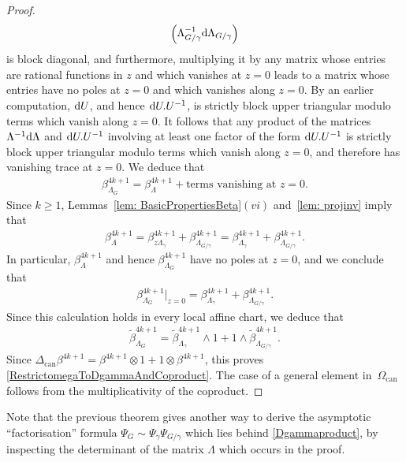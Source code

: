 \documentclass[pdftex]{sigma}%
\numberwithin{equation}{section}
\newcommand{\can}{\mathrm{can}}
\newcommand{\0}{\color{blue}{\mathsf{0}}}
\begin{document}
\begin{proof}
\begin{gather*}
\begin{pmatrix}
 \Lambda_{G/\gamma}^{-1} {\rm d} \Lambda_{G/\gamma}
 \end{pmatrix}
 \end{gather*}
is block diagonal, and furthermore, multiplying it by any matrix whose entries are rational functions in $z$ and which vanishes at $z=0$ leads to a matrix whose entries have no poles at $z=0$ and which vanishes along $z=0$. By an earlier computation, ${\rm d}U$, and hence ${\rm d}U. U^{-1}$, is strictly block upper triangular modulo terms which vanish along $z=0$.
 It follows that any product of the matrices $ \Lambda^{-1} {\rm d}\Lambda$ and ${\rm d}U. U^{-1}$ involving at least one factor of the form ${\rm d}U. U^{-1}$ is strictly block upper triangular modulo terms which vanish along $z=0$, and therefore has vanishing trace at $z=0$. We deduce that
\begin{gather*}
\beta_{\Lambda_G}^{4k+1} = \beta_{\Lambda}^{4k+1} + \text{terms vanishing at } z=0 .
\end{gather*}
Since $k\geq 1$, Lemmas~\ref{lem: BasicPropertiesBeta}$(vi)$ and~\ref{lem: projinv} imply that
 \begin{gather*}
 \beta^{4k+1}_{\Lambda} = \beta^{4k+1}_{z \Lambda_{\gamma}} + \beta^{4k+1}_{\Lambda_{G/\gamma}} = \beta^{4k+1}_{\Lambda_{\gamma}} + \beta^{4k+1}_{\Lambda_{G/\gamma}}.
 \end{gather*}
 In particular, $\beta^{4k+1}_{\Lambda}$ and hence $\beta^{4k+1}_{\Lambda_G}$ have no poles at $z=0$, and we conclude that
 \begin{gather*}
 \beta_{\Lambda_G}^{4k+1} \Big|_{z=0} = \beta^{4k+1}_{\Lambda_{\gamma}} + \beta^{4k+1}_{\Lambda_{G/\gamma}}.
 \end{gather*}
 Since this calculation holds in every local affine chart, we deduce that
 \begin{gather*}
 \widetilde{\beta}^{4k+1}_{\Lambda_G}= \widetilde{\beta}_{\Lambda_\gamma}^{4k+1} \wedge 1 + 1\wedge \widetilde{\beta}_{\Lambda_{G/\gamma}}^{4k+1}.
 \end{gather*}
 Since $\Delta_{\can} \beta ^{4k+1} = \beta^{4k+1} \otimes 1+ 1 \otimes \beta^{4k+1}$, this proves \eqref{RestrictomegaToDgammaAndCoproduct}. The case of a general element in~$\Omega_{\can}$ follows from the multiplicativity of the coproduct.
\end{proof}

\begin{rem}
Note that the previous theorem gives another way to derive the asymptotic ``factorisation'' formula $\Psi_G \sim \Psi_{\gamma} \Psi_{G/\gamma}$ which lies behind \eqref{Dgammaproduct}, by inspecting the determinant of the matrix $\Lambda$ which occurs in the proof.
\end{rem}
\end{document}
